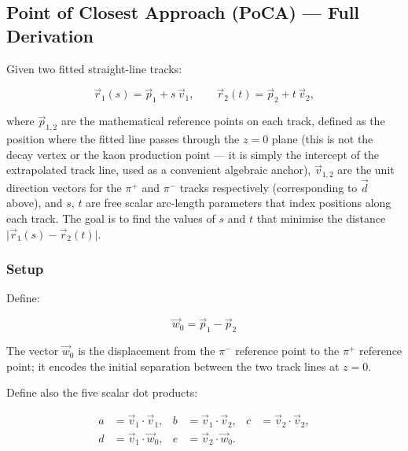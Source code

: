 \subsection{Point of Closest Approach (PoCA) --- Full Derivation}

Given two fitted straight-line tracks:

\begin{equation}
    \vec{r}_1(s) = \vec{p}_1 + s\,\vec{v}_1, \qquad
    \vec{r}_2(t) = \vec{p}_2 + t\,\vec{v}_2,
\end{equation}

\noindent
where $\vec{p}_{1,2}$ are the mathematical reference points on each track, defined as the position where the fitted line passes through the $z = 0$ plane (this is not the decay vertex or the kaon production point --- it is simply the intercept of the extrapolated track line, used as a convenient algebraic anchor), $\vec{v}_{1,2}$ are the unit direction vectors for the $\pi^+$ and $\pi^-$ tracks respectively (corresponding to $\vec{d}$ above), and $s$, $t$ are free scalar arc-length parameters that index positions along each track. The goal is to find the values of $s$ and $t$ that minimise the distance $\bigl|\vec{r}_1(s) - \vec{r}_2(t)\bigr|$.

\subsubsection{Setup}

Define:

\begin{equation}
    \vec{w}_0 = \vec{p}_1 - \vec{p}_2
\end{equation}

\noindent
The vector $\vec{w}_0$ is the displacement from the $\pi^-$ reference point to the $\pi^+$ reference point; it encodes the initial separation between the two track lines at $z = 0$.

Define also the five scalar dot products:

\begin{align}
    a &= \vec{v}_1 \cdot \vec{v}_1, &
    b &= \vec{v}_1 \cdot \vec{v}_2, &
    c &= \vec{v}_2 \cdot \vec{v}_2, \\[4pt]
    d &= \vec{v}_1 \cdot \vec{w}_0, &
    e &= \vec{v}_2 \cdot \vec{w}_0. & &
\end{align}

